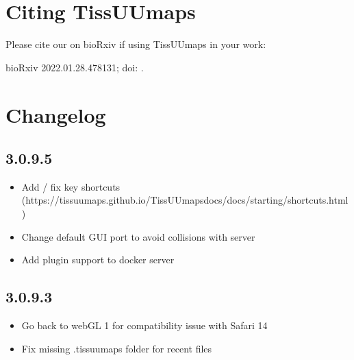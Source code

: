 \documentclass[letterpaper,10pt,english,openany,oneside]{sphinxmanual}
\begin{document}
\sphinxstepscope


\section{Citing TissUUmaps}
\label{\detokenize{docs/intro/citing:citing-tissuumaps}}\label{\detokenize{docs/intro/citing::doc}}
\sphinxAtStartPar
Please cite our  on bioRxiv if using TissUUmaps in your work:

\sphinxAtStartPar
{}  bioRxiv 2022.01.28.478131; doi: .

\sphinxstepscope


\section{Changelog}
\label{\detokenize{docs/intro/versions:changelog}}\label{\detokenize{docs/intro/versions::doc}}

\subsection{3.0.9.5}
\label{\detokenize{docs/intro/versions:id1}}\begin{itemize}
\item {} 
\sphinxAtStartPar
Add / fix key shortcuts (https://tissuumaps.github.io/TissUUmaps\sphinxhyphen{}docs/docs/starting/shortcuts.html)

\item {} 
\sphinxAtStartPar
Change default GUI port to avoid collisions with server

\item {} 
\sphinxAtStartPar
Add plugin support to docker server

\end{itemize}


\subsection{3.0.9.3}
\label{\detokenize{docs/intro/versions:id2}}\begin{itemize}
\item {} 
\sphinxAtStartPar
Go back to webGL 1 for compatibility issue with Safari 14

\item {} 
\sphinxAtStartPar
Fix missing .tissuumaps folder for recent files

\end{itemize}
\end{document}
